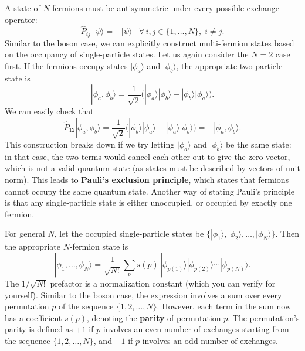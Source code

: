 \documentclass[pra,11pt]{revtex4}
\begin{document}
A state of $N$ fermions must be antisymmetric under every possible
exchange operator:
$$\hat{P}_{ij}\; |\psi\rangle = -|\psi\rangle \;\;\; \forall\, i,j\in\{1,\dots,N\}, \; i\ne j.$$
Similar to the boson case, we can explicitly construct multi-fermion
states based on the occupancy of single-particle states.  Let us again
consider the $N=2$ case first.  If the fermions occupy states
$|\phi_a\rangle$ and $|\phi_b\rangle$, the appropriate two-particle
state is
$$|\phi_a,\phi_b\rangle = \frac{1}{\sqrt{2}} \Big(|\phi_a\rangle|\phi_b\rangle - |\phi_b\rangle|\phi_a\rangle\Big).$$
We can easily check that
$$\hat{P}_{12} |\phi_a,\phi_b\rangle = \frac{1}{\sqrt{2}} \Big(|\phi_b\rangle|\phi_a\rangle - |\phi_a\rangle|\phi_b\rangle\Big) = - |\phi_a,\phi_b\rangle.$$
This construction breaks down if we try letting $|\phi_a\rangle$ and
$|\phi_b\rangle$ be the same state: in that case, the two terms would
cancel each other out to give the zero vector, which is not a valid
quantum state (as states must be described by vectors of unit norm).
This leads to \textbf{Pauli's exclusion principle}, which states that
fermions cannot occupy the same quantum state.  Another way of stating
Pauli's principle is that any single-particle state is either
unoccupied, or occupied by exactly one fermion.

For general $N$, let the occupied single-particle states be
$\{|\phi_1\rangle, |\phi_2\rangle,\dots,|\phi_N\rangle\}$.  Then the
appropriate $N$-fermion state is
$$|\phi_1,\dots,\phi_N\rangle = \frac{1}{\sqrt{N!}} \sum_p s(p)\, |\phi_{p(1)}\rangle |\phi_{p(2)}\rangle \cdots |\phi_{p(N)}\rangle.$$
The $1/\sqrt{N!}$ prefactor is a normalization constant (which you can
verify for yourself).  Similar to the boson case, the expression
involves a sum over every permutation $p$ of the sequence
$\{1,2,\dots,N\}$.  However, each term in the sum now has a
coefficient $s(p)$, denoting the \textbf{parity} of permutation $p$.
The permutation's parity is defined as $+1$ if $p$ involves an even
number of exchanges starting from the sequence $\{1,2,\dots,N\}$, and
$-1$ if $p$ involves an odd number of exchanges.
\end{document}
